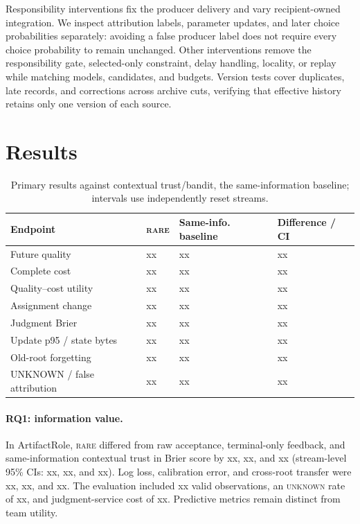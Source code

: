 \documentclass[sigconf,anonymous]{aamas}
\newcommand{\rare}{\textsc{rare}}
\newcommand{\unknown}{\textsc{unknown}}
\begin{document}
Responsibility interventions fix the producer delivery and vary recipient-owned integration. We inspect attribution labels, parameter updates, and later choice probabilities separately: avoiding a false producer label does not require every choice probability to remain unchanged. Other interventions remove the responsibility gate, selected-only constraint, delay handling, locality, or replay while matching models, candidates, and budgets. Version tests cover duplicates, late records, and corrections across archive cuts, verifying that effective history retains only one version of each source.

\section{Results}
\begin{table}[t]
\centering\small
\setlength{\tabcolsep}{2.2pt}
\begin{tabular}{p{}p{}p{}p{}}
\toprule
Endpoint & \rare{} & Same-info. baseline & Difference / CI \\
\midrule
Future quality & xx & xx & xx \\
Complete cost & xx & xx & xx \\
Quality--cost utility & xx & xx & xx \\
Assignment change & xx & xx & xx \\
Judgment Brier & xx & xx & xx \\
Update p95 / state bytes & xx & xx & xx \\
Old-root forgetting & xx & xx & xx \\
UNKNOWN / false attribution & xx & xx & xx \\
\bottomrule
\end{tabular}
\caption{Primary results against contextual trust/bandit, the same-information baseline; intervals use independently reset streams.}
\label{tab:results}
\end{table}

\paragraph{RQ1: information value.} In ArtifactRole, \rare{} differed from raw acceptance, terminal-only feedback, and same-information contextual trust in Brier score by xx, xx, and xx (stream-level 95\% CIs: xx, xx, and xx). Log loss, calibration error, and cross-root transfer were xx, xx, and xx. The evaluation included xx valid observations, an \unknown{} rate of xx, and judgment-service cost of xx. Predictive metrics remain distinct from team utility.
\end{document}
